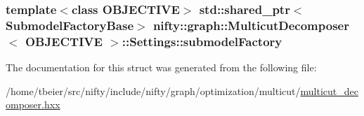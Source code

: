 \subsubsection[{submodel\+Factory}]{\setlength{\rightskip}{0pt plus 5cm}template$<$class O\+B\+J\+E\+C\+T\+I\+V\+E$>$ std\+::shared\+\_\+ptr$<${\bf Submodel\+Factory\+Base}$>$ {\bf nifty\+::graph\+::\+Multicut\+Decomposer}$<$ O\+B\+J\+E\+C\+T\+I\+V\+E $>$\+::Settings\+::submodel\+Factory}\label{structnifty_1_1graph_1_1MulticutDecomposer_1_1Settings_ad50184eb9b4e9059afa29fca25572ad4}


The documentation for this struct was generated from the following file\+:\begin{DoxyCompactItemize}
\item 
/home/tbeier/src/nifty/include/nifty/graph/optimization/multicut/\hyperlink{multicut__decomposer_8hxx}{multicut\+\_\+decomposer.\+hxx}\end{DoxyCompactItemize}
